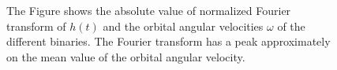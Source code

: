 \begin{figure}
   \quad

  \quad
{}
   
   
\caption{The Figure shows the absolute  value of normalized Fourier transform of $h(t)$ and the orbital angular velocities $\omega$ of the different binaries. The Fourier transform has a peak approximately on the mean value of the orbital angular velocity.}
\label{fourier_omega_b345}

\end{figure}
